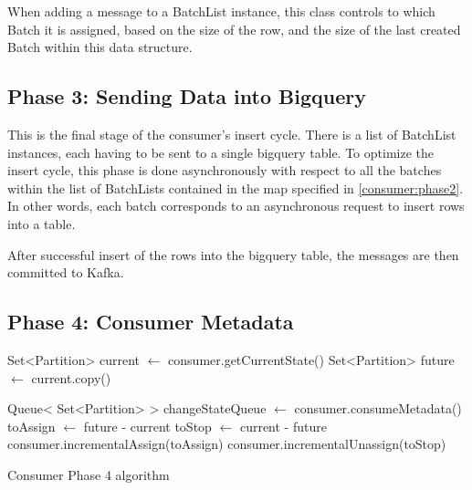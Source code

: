 When adding a message to a BatchList instance, this class controls to which Batch it is assigned, based on the size of the row, and the size of the last created Batch within this data structure.

\subsection{Phase 3: Sending Data into Bigquery}

This is the final stage of the consumer's insert cycle. There is a list of BatchList instances, each having to be sent to a single bigquery table. To optimize the insert cycle, this phase is done asynchronously with respect to all the batches within the list of BatchLists contained in the map specified in \ref{consumer:phase2}. In other words, each batch corresponds to an asynchronous request to insert rows into a table.

After successful insert of the rows into the bigquery table, the messages are then committed to Kafka. 

\subsection{Phase 4: Consumer Metadata}

\IncMargin{1em}
\begin{algorithm}[h]
\Output{}
\BlankLine

Set<Partition> current $\gets$ consumer.getCurrentState()\;
Set<Partition> future $\gets$ current.copy()\;

Queue< Set<Partition> > changeStateQueue $\gets$ consumer.consumeMetadata()\;
toAssign $\gets$ future - current\; \label{algo:phase_4_toAssign}
toStop $\gets$ current - future\;
consumer.incrementalAssign(toAssign)\;
consumer.incrementalUnassign(toStop)\; \label{algo:phase_4_incremental_assign}

\caption{Consumer Phase 4 algorithm}
\label{algo:phase_4}
\end{algorithm}\DecMargin{1em}

